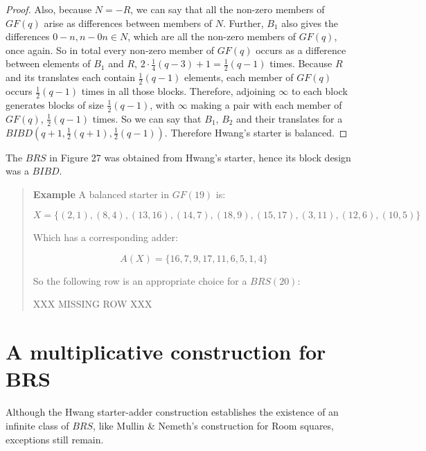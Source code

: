 \documentclass[
  11pt,
  a4paper]{book}
\newcounter{examplecounter}
\begin{document}
\begin{proof}
Also, because $N = -R$, we can say that all the non-zero
members of $GF(q)$ arise as differences between members of
$N$. Further, $B_1$ also gives the differences
$0 - n, n - 0 n\in N$, which are all the non-zero members
of $GF(q)$, once again. So in total every non-zero member of
$GF(q)$ occurs as a difference between elements of $B_1$ and
$R$, $2 \cdot \frac{1}{4}(q - 3) + 1 = \frac{1}{2} (q - 1)$
times.  Because $R$ and its translates each contain
$\frac{1}{2}(q - 1)$ elements, each member of $GF(q)$ occurs
$\frac{1}{2}(q - 1)$ times in all those blocks. Therefore,
adjoining $\infty$ to each block generates blocks of size
$\frac{1}{2}(q - 1)$, with $\infty$ making a pair with each
member of $GF(q)$, $\frac{1}{2}(q - 1)$ times.  So we can say
that $B_1$, $B_2$ and their translates for a
$BIBD(q  +1, \frac{1}{2}(q + 1), \frac{1}{2}(q - 1))$.
Therefore Hwang’s starter is balanced. 
\end{proof}

The \(BRS\) in Figure 27 was obtained from Hwang's starter, hence its
block design was a \(BIBD\).

\begin{quote}  \textbf{Example } \quad 
A balanced starter in $GF(19)$ is:

\begin{equation}
X = \{(2,1),(8,4),(13,16),(14,7),(18,9),(15,17),(3,11),(12,6),(10,5)\}
\end{equation}

Which has a corresponding adder:

\begin{equation}
A(X) = \{16,7,9,17,11,6,5,1,4\}
\end{equation}

So the following row is an appropriate choice for a
$BRS(20)$:

XXX MISSING ROW XXX

 \end{quote}

\hypertarget{a-multiplicative-construction-for-brs}{%
\section{A multiplicative construction for BRS}\label{a-multiplicative-construction-for-brs}}

Although the Hwang starter-adder construction establishes
the existence of an infinite class of \(BRS\), like Mullin \&
Nemeth's construction for Room squares, exceptions still
remain.
\end{document}
